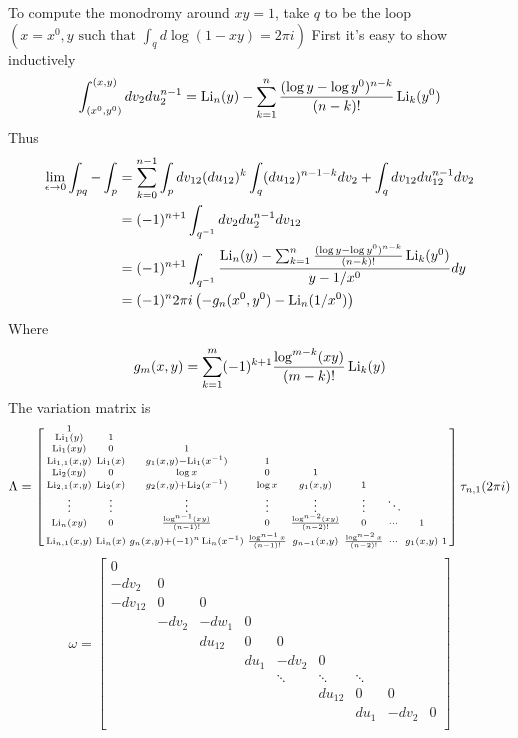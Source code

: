 \documentclass[main]{subfiles}
\begin{document}
To compute the monodromy around $xy=1$, take $q$ to be the loop $(x=x^0,y\text{ such that }\int_qd\log(1-xy)=2\pi i)$
First it's easy to show inductively
\[\int_{(x^0,y^0)}^{(x,y)} dv_2du_2^{n-1}=\operatorname{Li}_n(y)-\sum_{k=1}^n\frac{(\log y-\log y^0)^{n-k}}{(n-k)!}\operatorname{Li}_k(y^0)\]
Thus
\begin{align*}
\lim_{\epsilon\to0}\int_{pq}-\int_{p}&=\sum_{k=0}^{n-1}\int_pdv_{12}(du_{12})^k\int_q(du_{12})^{n-1-k}dv_2
+\int_qdv_{12}du_{12}^{n-1}dv_2 \\
&=(-1)^{n+1}\int_{q^{-1}}dv_2du_{2}^{n-1}dv_{12} \\
&=(-1)^{n+1}\int_{q^{-1}}\frac{\operatorname{Li}_n(y)-\sum_{k=1}^n\frac{(\log y-\log y^0)^{n-k}}{(n-k)!}\operatorname{Li}_k(y^0)}{y-1/x^0}dy \\
&=(-1)^{n}2\pi i\left(-g_n(x^0,y^0)-\operatorname{Li}_n(1/x^0)\right)
\end{align*}
Where
\[g_m(x,y)=\sum_{k=1}^{m}(-1)^{k+1}\frac{\log^{m-k}(xy)}{(m-k)!}\operatorname{Li}_{k}(y)\]
The variation matrix is
\[\Lambda=\left[\begin{smallmatrix}
1\\
\operatorname{Li}_1(y)&1\\
\operatorname{Li}_1(xy)&0&1\\
\operatorname{Li}_{1,1}(x,y)&\operatorname{Li}_1(x)&g_1(x,y)-\operatorname{Li}_1(x^{-1})&1\\
\operatorname{Li}_2(xy)&0&\log x&0&1\\
\operatorname{Li}_{2,1}(x,y)&\operatorname{Li}_2(x)&g_2(x,y)+\operatorname{Li}_2(x^{-1})&\log x&g_1(x,y)&1\\
\vdots&\vdots&\vdots&\vdots&\vdots&\vdots&\ddots\\
\operatorname{Li}_n(xy)&0&\frac{\log^{n-1}(xy)}{(n-1)!}&0&\frac{\log^{n-2}(xy)}{(n-2)!}&0&\cdots&1\\
\operatorname{Li}_{n,1}(x,y)&\operatorname{Li}_n(x)&g_n(x,y)+(-1)^n\operatorname{Li}_n(x^{-1})&\frac{\log^{n-1}x}{(n-1)!}&g_{n-1}(x,y)&\frac{\log^{n-2}x}{(n-2)!}&\cdots&g_1(x,y)&1
\end{smallmatrix}\right]\tau_{n,1}(2\pi i)\]
\[\omega=\begin{bmatrix}
0\\
-dv_2&0\\
-dv_{12}&0&0 \\
&-dv_2&-dw_1&0 \\
&&du_{12}&0&0 \\
&&&du_1&-dv_2&0 \\
&&&&\ddots&\ddots&\ddots \\
&&&&&du_{12}&0&0 \\
&&&&&&du_1&-dv_2&0 \\
\end{bmatrix}\]
\end{document}
